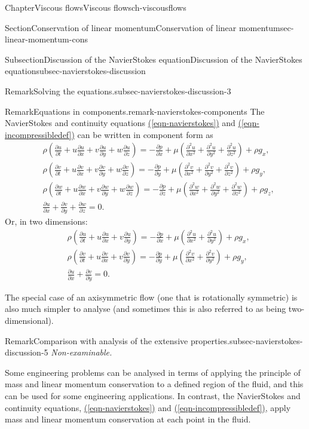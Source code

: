 \documentclass[oneside,10pt,]{book}
\newcommand{\xreffont}{\relax}
\numberwithin{equation}{section}
\newcommand{\pd}[2]{\frac{\partial#1}{\partial#2}}
\begin{document}
\begin{chapterptx}{Chapter}{Viscous flows}{}{Viscous flows}{}{}{ch-viscousflows}
\begin{sectionptx}{Section}{Conservation of linear momentum}{}{Conservation of linear momentum}{}{}{sec-linear-momentum-cons}
\begin{subsectionptx}{Subsection}{Discussion of the Navier\textendash{}Stokes equation}{}{Discussion of the Navier\textendash{}Stokes equation}{}{}{subsec-navierstokes-discussion}
\begin{remark}{Remark}{Solving the equations.}{subsec-navierstokes-discussion-3}
\end{remark}
\begin{remark}{Remark}{Equations in components.}{remark-navierstokes-components}%
The Navier\textendash{}Stokes and continuity equations \hyperref[eqn-navierstokes]{({\xreffont\ref{eqn-navierstokes}})} and \hyperref[eqn-incompressibledef]{({\xreffont\ref{eqn-incompressibledef}})} can be written in component form as%
\begin{align*}
&\rho\left(\pd{u}{t}+u\pd{u}{x}+v\pd{u}{y}+w\pd{u}{z}\right)=-\pd{p}{x}+\mu\left(\pd{^2u}{x^2}+\pd{^2u}{y^2}+\pd{^2u}{z^2}\right)+\rho g_x,\\
&\rho\left(\pd{v}{t}+u\pd{v}{x}+v\pd{v}{y}+w\pd{v}{z}\right)=-\pd{p}{y}+\mu\left(\pd{^2v}{x^2}+\pd{^2v}{y^2}+\pd{^2v}{z^2}\right)+\rho g_y,\\
&\rho\left(\pd{w}{t}+u\pd{w}{x}+v\pd{w}{y}+w\pd{w}{z}\right)=-\pd{p}{z}+\mu\left(\pd{^2w}{x^2}+\pd{^2w}{y^2}+\pd{^2w}{z^2}\right)+\rho g_z,\\
&\pd{u}{x}+\pd{v}{y}+\pd{w}{z}=0.
\end{align*}
Or, in two dimensions:%
\begin{align*}
&\rho\left(\pd{u}{t}+u\pd{u}{x}+v\pd{u}{y}\right)=-\pd{p}{x}+\mu\left(\pd{^2u}{x^2}+\pd{^2u}{y^2}\right)+\rho g_x,\\
&\rho\left(\pd{v}{t}+u\pd{v}{x}+v\pd{v}{y}\right)=-\pd{p}{y}+\mu\left(\pd{^2v}{x^2}+\pd{^2v}{y^2}\right)+\rho g_y,\\
&\pd{u}{x}+\pd{v}{y}=0.
\end{align*}
%
\par
The special case of an axisymmetric flow (one that is rotationally symmetric) is also much simpler to analyse (and sometimes this is also referred to as being two-dimensional).%
\end{remark}
\begin{remark}{Remark}{Comparison with analysis of the extensive properties.}{subsec-navierstokes-discussion-5}%
\emph{Non-examinable.}%
\par
Some engineering problems can be analysed in terms of applying the principle of mass and linear momentum conservation to a defined region of the fluid, and this can be used for some engineering applications. In contrast, the Navier\textendash{}Stokes and continuity equations, \hyperref[eqn-navierstokes]{({\xreffont\ref{eqn-navierstokes}})} and \hyperref[eqn-incompressibledef]{({\xreffont\ref{eqn-incompressibledef}})}, apply mass and linear momentum conservation at each point in the fluid.%
\end{remark}

\end{subsectionptx}
\end{sectionptx}
\end{chapterptx}
\end{document}
